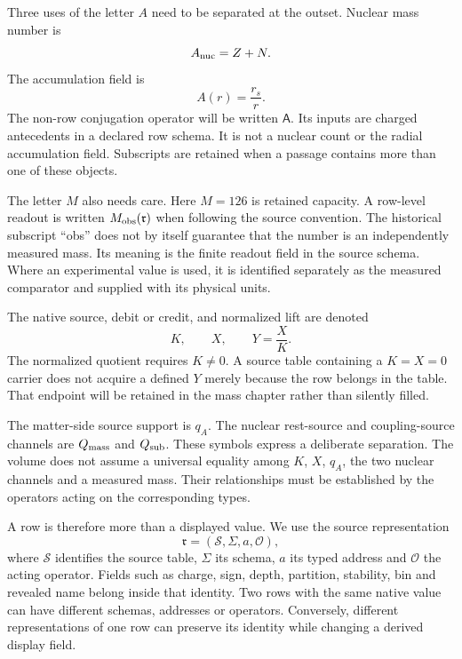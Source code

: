 Three uses of the letter $A$ need to be separated at the outset. Nuclear mass number is
\begin{equation}
A_{\rm nuc}=Z+N.
\end{equation}
The accumulation field is
\begin{equation}
A(r)=\frac{r_s}{r}.
\end{equation}
The non-row conjugation operator will be written $\mathsf A$. Its inputs are charged antecedents in a declared row schema. It is not a nuclear count or the radial accumulation field. Subscripts are retained when a passage contains more than one of these objects.

The letter $M$ also needs care. Here $M=126$ is retained capacity. A row-level readout is written $M_{\rm obs}(\mathfrak r)$ when following the source convention. The historical subscript ``obs'' does not by itself guarantee that the number is an independently measured mass. Its meaning is the finite readout field in the source schema. Where an experimental value is used, it is identified separately as the measured comparator and supplied with its physical units.

The native source, debit or credit, and normalized lift are denoted
\begin{equation}
K,\qquad X,\qquad Y=\frac{X}{K}.
\end{equation}
The normalized quotient requires $K\ne0$. A source table containing a $K=X=0$ carrier does not acquire a defined $Y$ merely because the row belongs in the table. That endpoint will be retained in the mass chapter rather than silently filled.

The matter-side source support is $q_A$. The nuclear rest-source and coupling-source channels are $Q_{\rm mass}$ and $Q_{\rm sub}$. These symbols express a deliberate separation. The volume does not assume a universal equality among $K$, $X$, $q_A$, the two nuclear channels and a measured mass. Their relationships must be established by the operators acting on the corresponding types.

A row is therefore more than a displayed value. We use the source representation
\begin{equation}
\mathfrak r=(\mathcal S,\Sigma,a,\mathcal O),
\end{equation}
where $\mathcal S$ identifies the source table, $\Sigma$ its schema, $a$ its typed address and $\mathcal O$ the acting operator. Fields such as charge, sign, depth, partition, stability, bin and revealed name belong inside that identity. Two rows with the same native value can have different schemas, addresses or operators. Conversely, different representations of one row can preserve its identity while changing a derived display field.

